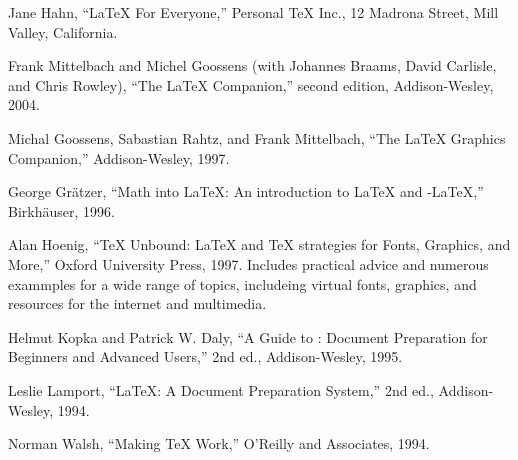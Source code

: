 
%


\begin{thebibliography}{99}

 Jane Hahn, ``\LaTeX{} For Everyone,'' Personal TeX Inc., 
  12 Madrona Street, Mill Valley, California.

 Frank Mittelbach and Michel Goossens (with
Johannes Braams, David Carlisle, and Chris Rowley),
  ``The \LaTeX{} Companion,'' second edition, Addison-Wesley, 2004.

Michal Goossens, Sabastian Rahtz, and Frank Mittelbach, ``The \LaTeX{} 
Graphics Companion,'' Addison-Wesley, 1997.

 George Gr\"atzer, ``Math into \LaTeX: An 
introduction to \LaTeX{} and \mbox{\AmS-\LaTeX},'' Birkh\"auser, 1996.

 Alan Hoenig, ``\TeX{} Unbound: \LaTeX{} and \TeX{} strategies
for Fonts, Graphics, and More,'' Oxford University Press, 1997. Includes
practical advice and numerous exammples for a wide range of topics,
includeing virtual fonts, graphics, and resources for the internet and
multimedia.

 Helmut Kopka and Patrick W. Daly, ``A Guide to \LaTeXe:
  Document Preparation for Beginners and Advanced Users,'' 2nd ed.,
  Addison-Wesley, 1995.

 Leslie Lamport, ``\LaTeX: A Document Preparation
  System,'' 2nd ed., Addison-Wesley, 1994.

 Norman Walsh, ``Making \TeX{} Work,'' O'Reilly and
  Associates, 1994.

\end{thebibliography}

